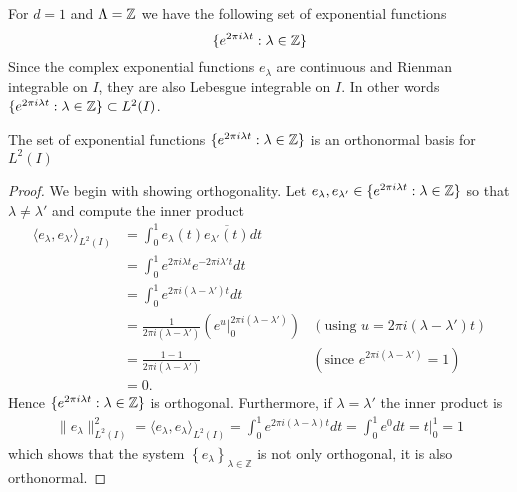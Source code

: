 \documentclass[../thesis.tex]{subfiles}
\begin{document}
For $d=1$ and $\Lambda=\mathbb{Z}$ we have the following set of exponential functions
\begin{equation}
    \{e^{2\pi i \lambda t } : \lambda \in \mathbb{Z}\}
\end{equation}
Since the complex exponential functions $e_{\lambda}$ are continuous and Rienman integrable on $I$, they are also Lebesgue integrable on $I$. In other words $\{e^{2\pi i \lambda t } : \lambda \in \mathbb{Z}\} \subset L^2(I)$. %
\begin{lemma}
    The set of exponential functions $\{e^{2\pi i \lambda t } : \lambda \in \mathbb{Z}\}$ is an orthonormal basis for $L^2(I)$
\end{lemma}
\begin{proof}
    We begin with showing orthogonality. Let $e_{\lambda}, e_{\lambda'} \in \{e^{2\pi i \lambda t } : \lambda \in \mathbb{Z}\} $ so that $\lambda \neq \lambda'$ and compute the inner product
    \begin{align*} 
        \langle e_{\lambda},e_{\lambda'} \rangle_{L^2(I)} &= \int_0^1 e_{\lambda}(t)\overline{e_{\lambda'}(t)} dt\\ 
        &= \int_0^1 e^{2 \pi i {\lambda}t} e^{-2 \pi i {\lambda'}t} dt\\
        &= \int_0^1 e^{2 \pi i (\lambda-\lambda')t} dt\\
        &=\frac{1}{2 \pi i (\lambda-\lambda')}\left( e^u  \big| _0^{2 \pi i (\lambda-\lambda')}\right) & (\text{using }u=2 \pi i (\lambda-\lambda')t)\\
        &=\frac{1-1}{2 \pi i (\lambda-\lambda')} & (\text{since } e^{2 \pi i (\lambda-\lambda')} = 1)\\
        &= 0.
    \end{align*}
    Hence $\{e^{2\pi i \lambda t } : \lambda \in \mathbb{Z}\}$ is orthogonal. Furthermore, if  $\lambda =\lambda'$ the inner product is
    \begin{align}\label{eq:exp_norm_one}
        \| e_\lambda \|^2_{L^2(I)} 
        = \langle e_{\lambda},e_{\lambda} \rangle_{L^2(I)} 
        = \int_0^1 e^{2 \pi i (\lambda-\lambda)t} dt
        = \int_0^1 e^{0} dt = t  \big| _0^{1}= 1
    \end{align}
    which shows that the system $\left\{ e_{\lambda} \right\}_{\lambda\in \mathbb{Z}}$ is not only orthogonal, it is also orthonormal. 


\end{proof}
\end{document}
